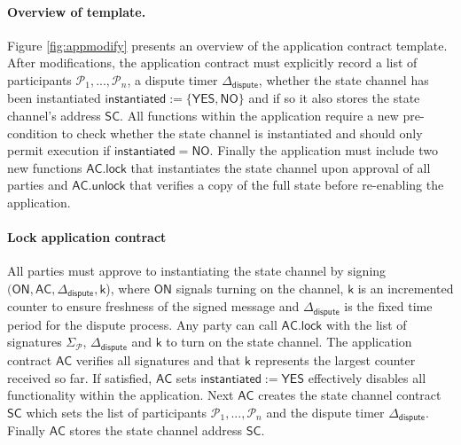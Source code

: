 \documentclass{llncs}
\newcommand{\instantiated}{\mathsf{instantiated}}
\newcommand{\instantiatedno}{\mathsf{NO}}
\newcommand{\instantiatedyes}{\mathsf{YES}}
\newcommand{\chanon}{\mathsf{ON}}
\newcommand{\participant}{\mathcal{P}}
\newcommand{\statechannel}{\mathsf{SC}}
\newcommand{\appcontract}{\mathsf{AC}}
\newcommand{\applock}{\mathsf{AC.lock}}
\newcommand{\appunlock}{\mathsf{AC.unlock}}
\newcommand{\timerdispute}{\mathsf{\Delta}_{\mathsf{dispute}}}
\begin{document}
\paragraph{Overview of template. } \label{sec:template} 
Figure \ref{fig:appmodify} presents an overview of the application contract template.
After modifications, the application contract must explicitly record a list of participants $\participant_{1},...,\participant_{n}$, a dispute timer $\timerdispute$, whether the state channel has been instantiated  $\instantiated := \{\instantiatedyes, \instantiatedno\}$ and if so it also stores the state channel's address  $\statechannel$. 
All functions within the application require a new pre-condition to check whether the state channel is instantiated and should only permit execution if $\instantiated = \instantiatedno$. 
Finally the application must include two new functions $\applock$ that instantiates the state channel upon approval of all parties and $\appunlock$ that verifies a copy of the full state before re-enabling the application. 




 
\paragraph{Lock application contract} All parties must approve to instantiating the state channel by signing $(\chanon, \appcontract, \timerdispute, \mathsf{k}$), where $\chanon$ signals turning on the channel, $\mathsf{k}$ is an incremented counter to ensure freshness of the signed message and $\timerdispute$ is the fixed time period for the dispute process. 
Any party can call $\applock$ with the list of signatures $\Sigma_{\participant}$, $\timerdispute$ and $\mathsf{k}$ to turn on the state channel. 
The application contract $\appcontract$ verifies all signatures and that $\mathsf{k}$ represents the largest counter received so far.
If satisfied, $\appcontract$ sets  $\instantiated := \instantiatedyes$ effectively disables all functionality within the application.
Next $\appcontract$ creates the state channel contract $\statechannel$ which sets the list of participants $\participant_{1},...,\participant_{n}$ and the dispute timer $\timerdispute$. 
Finally $\appcontract$ stores the state channel address $\statechannel$. 
 
\end{document}
